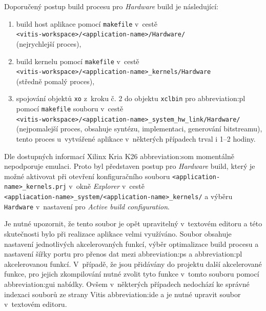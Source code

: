 \documentclass[a4paper, twoside, 11pt]{article}
\begin{document}
		\vspace*{0.35cm}
		Doporučený postup build procesu pro \textit{Hardware} build je následující:
		\begin{enumerate}
			\item build host aplikace pomocí \texttt{makefile} v~cestě\\\texttt{<vitis-workspace>/<application-name>/Hardware/}\\(nejrychlejší proces),
			\item build kernelu pomocí \texttt{makefile} v~cestě\\\texttt{<vitis-workspace>/<application-name>\_kernels/Hardware}\\(středně pomalý proces),
			\item spojování objektů \texttt{xo} z~kroku č. 2 do objektu \texttt{xclbin} pro \gls{abbreviation:pl} pomocí \texttt{makefile} souboru v~cestě\\\texttt{<vitis-workspace>/<application-name>\_system\_hw\_link/Hardware/} (nejpomalejší proces, obsahuje syntézu, implementaci, generování bitstreamu), tento proces u~vytvářené aplikace v~některých případech trval i 1–2 hodiny.
		\end{enumerate}
		\vspace*{0.75cm}
		Dle dostupných informací Xilinx Kria K26 \gls{abbreviation:som} momentálně nepodporuje emulaci. Proto byl představen postup pro \textit{Hardware} build, který je možné aktivovat při otevření konfiguračního souboru \texttt{<application-name>\_kernels.prj} v~okně \textit{Explorer} v~cestě\\\texttt{<appliacation-name>\_system/<application-name>\_kernels/} a výběru \texttt{Hardware} v~nastavení pro \textit{Active build configuration}.\par
		Je nutné upozornit, že tento soubor je opět upravitelný v~textovém editoru a této skutečnosti bylo při realizace aplikace velmi využíváno. Soubor obsahuje nastavení jednotlivých akcelerovaných funkcí, výběr optimalizace build procesu a nastavení šířky portu pro přenos dat mezi \gls{abbreviation:ps} a \gls{abbreviation:pl} akcelerovanou funkcí. V~případě, že jsou přidávány do projektu další akcelerované funkce, pro jejich zkompilování nutné zvolit tyto funkce v~tomto souboru pomocí \gls{abbreviation:gui} nabídky. Ovšem v~některých případech nedochází ke správné indexaci souborů ze strany Vitis \gls{abbreviation:ide} a je nutné upravit soubor v~textovém editoru.\par
\end{document}
